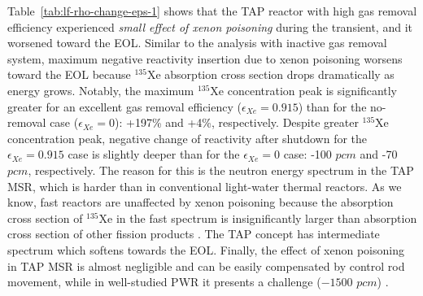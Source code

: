 Table~\ref{tab:lf-rho-change-eps-1} shows that the \gls{TAP} reactor with 
high gas removal efficiency experienced \emph{small effect of xenon poisoning} 
during the transient, and it worsened toward the \gls{EOL}. Similar to the 
analysis with inactive gas removal 
system, maximum negative reactivity insertion due to xenon poisoning worsens 
toward the \gls{EOL} because $^{135}$Xe absorption cross section drops 
dramatically as energy grows. Notably, 
the maximum $^{135}$Xe concentration peak is significantly greater for an 
excellent gas removal efficiency ($\epsilon_{Xe}=0.915$) than for the 
no-removal case ($\epsilon_{Xe}=0$): +197\% and +4\%, respectively. Despite 
greater $^{135}$Xe concentration peak, negative change of reactivity after 
shutdown for the $\epsilon_{Xe}=0.915$ case is slightly deeper than for the 
$\epsilon_{Xe}=0$ case: -100 $pcm$ and -70 $pcm$, respectively. The reason for 
this is the neutron energy spectrum in the \gls{TAP} \gls{MSR}, which is 
harder than in conventional light-water thermal reactors. As we know, 
fast reactors are unaffected by xenon poisoning because the absorption cross 
section of $^{135}$Xe in the fast spectrum is insignificantly larger than 
absorption cross section of other fission products \cite{bell_nuclear_1970, 
svanstrom_load_2016-2}. The \gls{TAP} concept has intermediate spectrum which 
softens towards the \gls{EOL}. Finally, the effect of xenon 
poisoning in \gls{TAP} \gls{MSR} is almost negligible and can be easily 
compensated by control rod movement, while in well-studied \gls{PWR} it 
presents a challenge ($-1500$ $pcm$) \cite{rykhlevskii_impact_2019}.
